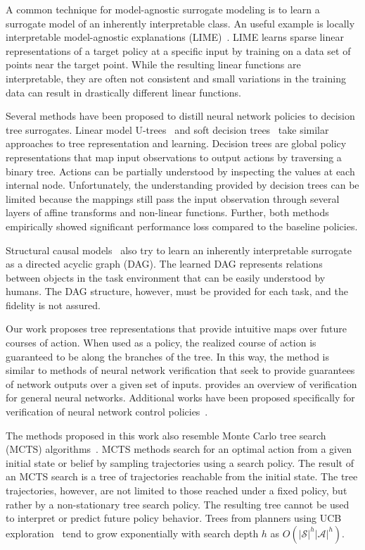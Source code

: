 \documentclass[letterpaper]{article} %
\begin{document}
A common technique for model-agnostic surrogate modeling is to learn a surrogate model of an inherently interpretable class.
An useful example is locally interpretable model-agnostic explanations (LIME)~\cite{ribeiro2016}.
LIME learns sparse linear representations of a target policy at a specific input by training on a data set of points near the target point.
While the resulting linear functions are interpretable, they are often not consistent and small variations in the training data can result in drastically different linear functions.

Several methods have been proposed to distill neural network policies to decision tree surrogates.
Linear model U-trees~\cite{liu2018} and soft decision trees~\cite{coppens2019} take similar approaches to tree representation and learning.
Decision trees are global policy representations that map input observations to output actions by traversing a binary tree.
Actions can be partially understood by inspecting the values at each internal node.
Unfortunately, the understanding provided by decision trees can be limited because the mappings still pass the input observation through several layers of affine transforms and non-linear functions.
Further, both methods empirically showed significant performance loss compared to the baseline policies.

Structural causal models~\cite{madumal2020} also try to learn an inherently interpretable surrogate as a directed acyclic graph (DAG).
The learned DAG represents relations between objects in the task environment that can be easily understood by humans.
The DAG structure, however, must be provided for each task, and the fidelity is not assured.

Our work proposes tree representations that provide intuitive maps over future courses of action.
When used as a policy, the realized course of action is guaranteed to be along the branches of the tree.
In this way, the method is similar to methods of neural network verification that seek to provide guarantees of network outputs over a given set of inputs.
\citet{liu2021} provides an overview of verification for general neural networks.
Additional works have been proposed specifically for verification of neural network control policies~\cite{sidrane2021}.

The methods proposed in this work also resemble Monte Carlo tree search (MCTS) algorithms~\cite{kocsis2006}.
MCTS methods search for an optimal action from a given initial state or belief by sampling trajectories using a search policy.
The result of an MCTS search is a tree of trajectories reachable from the initial state.
The tree trajectories, however, are not limited to those reached under a fixed policy, but rather by a non-stationary tree search policy.
The resulting tree cannot be used to interpret or predict future policy behavior.
Trees from planners using UCB exploration~\cite{auer2002} tend to grow exponentially with search depth $h$ as $O(|\mathcal{S}|^h|\mathcal{A}|^h)$. %
\end{document}
